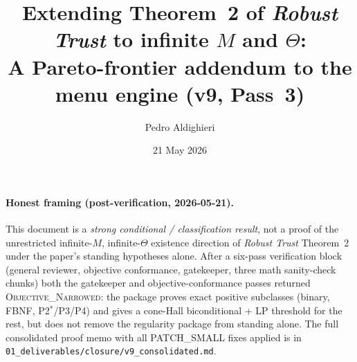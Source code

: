 \documentclass[11pt]{article}
\title{
  Extending Theorem~2 of \emph{Robust Trust} to infinite $M$ and $\Theta$:\\
  \large A Pareto-frontier addendum to the menu engine (v9, Pass~3)
}
\author{Pedro Aldighieri}
\date{21 May 2026}
\theoremstyle{definition}
\theoremstyle{remark}
\begin{document}
\maketitle

\paragraph{Honest framing (post-verification, 2026-05-21).}
This document is a \emph{strong conditional / classification result},
not a proof of the unrestricted infinite-$M$, infinite-$\Theta$
existence direction of \emph{Robust Trust} Theorem~2 under the paper's
standing hypotheses alone. After a six-pass verification block
(general reviewer, objective conformance, gatekeeper, three math
sanity-check chunks) both the gatekeeper and objective-conformance
passes returned \textsc{Objective\_Narrowed}: the package proves
exact positive subclasses (binary, FBNF, P2$^*$/P3/P4) and gives a
cone-Hall biconditional + LP threshold for the rest, but does not
remove the regularity package from standing alone. The full
consolidated proof memo with all PATCH\_SMALL fixes applied is in
\texttt{01\_deliverables/closure/v9\_consolidated.md}.
\end{document}
